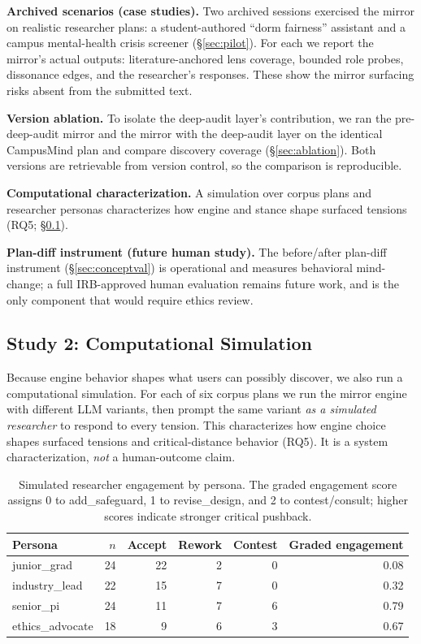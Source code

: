 \documentclass[sigconf,screen]{acmart}
\begin{document}
\noindent\textbf{Archived scenarios (case studies).} Two archived sessions
exercised the mirror on realistic researcher plans: a student-authored
``dorm fairness'' assistant and a campus mental-health crisis screener
(\S\ref{sec:pilot}). For each we report the mirror's actual outputs:
literature-anchored lens coverage, bounded role probes, dissonance edges, and
the researcher's responses. These show the mirror surfacing risks absent from
the submitted text.

\noindent\textbf{Version ablation.} To isolate the deep-audit layer's
contribution, we ran the pre-deep-audit mirror and the mirror with the
deep-audit layer on the identical CampusMind plan and compare discovery
coverage (\S\ref{sec:ablation}). Both versions are retrievable from version
control, so the comparison is reproducible.

\noindent\textbf{Computational characterization.} A simulation over corpus plans
and researcher personas characterizes how engine and stance shape surfaced
tensions (RQ5; \S\ref{sec:sim}).

\noindent\textbf{Plan-diff instrument (future human study).} The before/after
plan-diff instrument (\S\ref{sec:conceptval}) is operational and measures
behavioral mind-change; a full IRB-approved human evaluation remains future
work, and is the only component that would require ethics review.
\subsection{Study 2: Computational Simulation}
\label{sec:sim}

Because engine behavior shapes what users can possibly discover, we also run a
computational simulation. For each of six corpus plans we run the mirror engine
with different LLM variants, then prompt the same variant \emph{as a simulated
researcher} to respond to every tension. This characterizes how engine choice
shapes surfaced tensions and critical-distance behavior (RQ5). It is a system
characterization, \emph{not} a human-outcome claim.

\begin{table}[t]
\centering
\caption{Simulated researcher engagement by persona. The graded engagement
score assigns 0 to add\_safeguard, 1 to revise\_design, and 2 to
contest/consult; higher scores indicate stronger critical pushback.}
\label{tab:sim}
\begin{tabular}{@{}lrrrrr@{}}
\toprule
Persona & $n$ & Accept & Rework & Contest & Graded engagement \\
\midrule
junior\_grad & 24 & 22 & 2 & 0 & 0.08 \\
industry\_lead & 22 & 15 & 7 & 0 & 0.32 \\
senior\_pi & 24 & 11 & 7 & 6 & 0.79 \\
ethics\_advocate & 18 & 9 & 6 & 3 & 0.67 \\
\bottomrule
\end{tabular}
\end{table}
\end{document}
